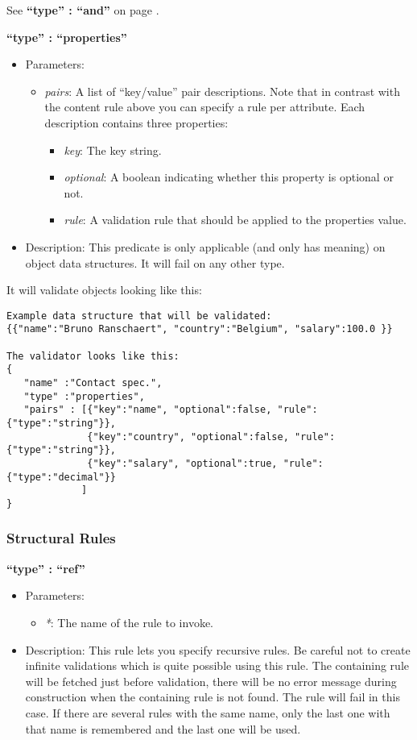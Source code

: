 \documentclass[a4paper]{article}
\newcommand{\ruledef}[3]{
\medskip
\textbf{#1}

\begin{itemize}
\setlength{\itemsep}{1pt}
\setlength{\parskip}{0pt}
\setlength{\parsep}{0pt}
   \item Parameters: #2
   \item Description: #3
\end{itemize}
}
\newcommand{\rulename}[1]{\textbf{``type'' : ``#1''}}
\newcommand{\param}[1]{\textsl{#1}:}
\begin{document}
See \rulename{and} on page \pageref{and}. 

\ruledef{\rulename{properties}}{\begin{itemize} \item \param{pairs} A list of ``key/value'' pair descriptions. Note that in contrast with the content rule above you can specify a rule per attribute. Each description contains three properties: \begin{itemize} \item \param{key} The key string. \item \param{optional} A boolean indicating whether this property is optional or not. \item \param{rule} A validation rule that should be applied to the properties value. \end{itemize}  \end{itemize}}{This predicate is only applicable (and only has meaning) on object data structures. It will fail on any other type.}

It will validate objects looking like this:
 
\begin{lstlisting}
Example data structure that will be validated:
{{"name":"Bruno Ranschaert", "country":"Belgium", "salary":100.0 }}

The validator looks like this:
{
   "name" :"Contact spec.",
   "type" :"properties",
   "pairs" : [{"key":"name", "optional":false, "rule":{"type":"string"}},
              {"key":"country", "optional":false, "rule":{"type":"string"}},
              {"key":"salary", "optional":true, "rule":{"type":"decimal"}}
             ]
}
\end{lstlisting}

\subsubsection{Structural Rules }

\ruledef{\rulename{ref}}{\begin{itemize} \item \param{*} The name of the rule to invoke. \end{itemize}}{ This rule lets you specify recursive rules. Be careful not to create infinite validations which is quite possible using this rule. The containing rule will be fetched just before validation, there will be no error message during construction when the containing rule is not found. The rule will fail in this case. If there are several rules with the same name, only the last one with that name is remembered and the last one will be used.}
\end{document}
